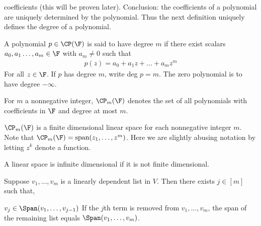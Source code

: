 \documentclass{article}
\begin{document}
  coefficients (this will be proven later). Conclusion: the coefficients of a polynomial are uniquely determined by the polynomial. Thus the next definition uniquely defines
  the degree of a polynomial.
  \begin{defn}
    A polynomial $p \in \CP(\F)$ is said to have degree $m$ if there exist scalars $a_0,a_1\dots,a_m \in \F$ with $a_m \neq 0$ such that 
    \begin{align*}
      p(z) = a_0 + a_1z + \dots + a_mz^m
    \end{align*}
    For all $z \in \F$. If $p$ has degree $m$, write deg $ p = m$. The zero polynomial is to have degree $-\infty$.
  \end{defn}
  \begin{defn}
    For $m$ a nonnegative integer, $\CP_m(\F)$ denotes the set of all polynomials with coefficients in $\F$ and degree at most $m$.
  \end{defn}
  \begin{prop}
    $\CP_m(\F)$ is a finite dimensional linear space for each nonnegative integer $m$. Note that $\CP_m(\F) = \text{span}(z_1, \dots, z^m)$. Here we are slightly abusing
    notation by letting $z^k$ denote a function.
  \end{prop}
  \begin{defn}
    A linear space is infinite dimensional if it is not finite dimensional.
  \end{defn}
  \begin{lemma}\label{lem:lin.dep}
    Suppose $v_1, \dots, v_m$ is a linearly dependent list in $V$. Then there exists $j \in [m]$ such that,
    \begin{enumerate}[label=\alph*)]
      \ii $v_j \in \Span(v_1, \dots, v_{j - 1})$
      \ii If the $j$th term is removed from $v_1, \dots, v_m$, the span of the remaining list equals $\Span(v_1, \dots, v_m)$.
    \end{enumerate}
  \end{lemma}
\end{document}
